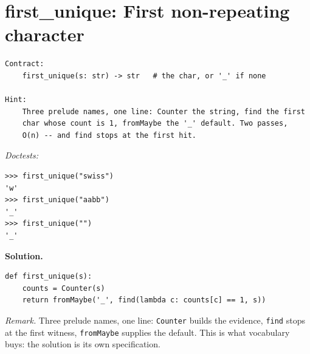 \documentclass[11pt,letterpaper]{book}
\begin{document}
\section{first\_unique: First non-repeating character}
\begin{lstlisting}[style=spec]
Contract:
    first_unique(s: str) -> str   # the char, or '_' if none

Hint:
    Three prelude names, one line: Counter the string, find the first
    char whose count is 1, fromMaybe the '_' default. Two passes,
    O(n) -- and find stops at the first hit.
\end{lstlisting}
\noindent\textit{Doctests:}
\begin{lstlisting}[style=spec]
>>> first_unique("swiss")
'w'
>>> first_unique("aabb")
'_'
>>> first_unique("")
'_'
\end{lstlisting}
\noindent\textbf{Solution.}
\begin{lstlisting}[style=code]
def first_unique(s):
    counts = Counter(s)
    return fromMaybe('_', find(lambda c: counts[c] == 1, s))
\end{lstlisting}

\noindent\textit{Remark.} Three prelude names, one line: \texttt{Counter} builds the
evidence, \texttt{find} stops at the first witness, \texttt{fromMaybe} supplies
the default. This is what vocabulary buys: the solution is its own
specification.
\end{document}
